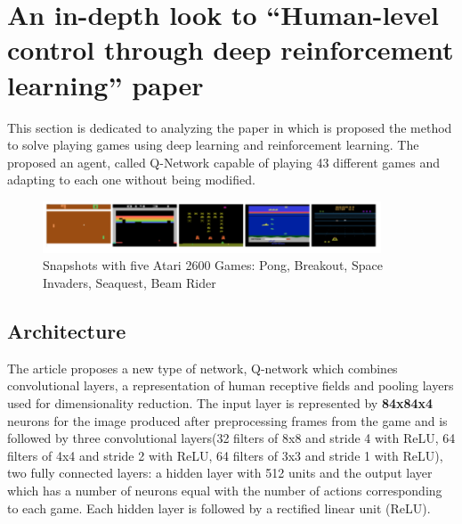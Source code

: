 \newpage

\section{An in-depth look to ``Human-level control through deep reinforcement learning'' paper\cite{nature}}
This section is dedicated to analyzing the paper in which is proposed the method to solve playing games using deep learning and reinforcement learning. The proposed an agent, called Q-Network capable of playing 43 different games and adapting to each one without being modified.


\begin{figure}[h]
	\begin{center}
		\includegraphics[width=380px,height=58px]{src/img/state/ataripic}
		\caption{Snapshots with five Atari 2600 Games: Pong, Breakout, Space Invaders, Seaquest, Beam Rider} \label{fig:ataripic}
    \end{center}
\end{figure}




\subsection{Architecture\cite{nature}}
The article\cite{nature} proposes a new type of network, Q-network which combines convolutional layers, a representation of human receptive fields and pooling layers used for dimensionality reduction. The input layer is represented by \textbf{84x84x4} neurons for the image produced after preprocessing frames from the game and is followed by three convolutional layers(32 filters of 8x8 and stride 4 with ReLU, 64 filters of 4x4 and stride 2 with ReLU, 64 filters of 3x3 and stride 1 with ReLU), two fully connected layers: a hidden layer with 512 units and the output layer which has a number of neurons equal with the number of actions corresponding to each game. Each hidden layer is followed by a rectified linear unit (ReLU).



